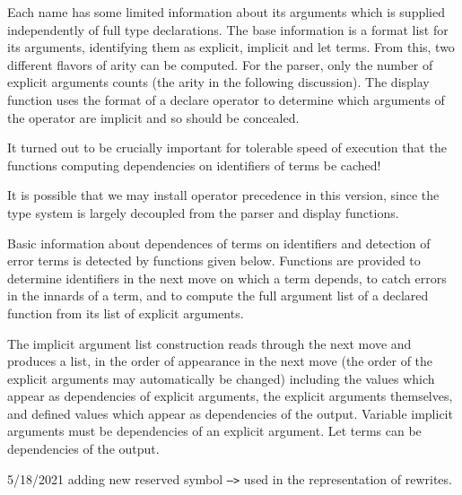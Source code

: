 \documentclass[12pt]{article}
\begin{document}
Each name has some limited information about its arguments which is supplied independently of full type declarations.  The base information is
a format list for its arguments, identifying them as explicit, implicit and let terms.  From this, two different flavors of arity can be computed.  For the parser,
only the number of explicit arguments counts (the arity in the following discussion).    The display function uses the format of a declare operator to determine
which arguments of the operator are implicit and so should be concealed.

It turned out to be crucially important for tolerable speed of execution that the functions computing dependencies on identifiers of terms be cached!

It is possible that we may install operator precedence in this version, since the type system is largely decoupled from the parser and display functions.

Basic information about dependences of terms on identifiers and detection of error terms is detected by functions given below.  Functions are provided to determine identifiers
in the next move on which a term depends, to catch errors in the innards of a term, and to compute the full argument list of a declared function from its list of explicit arguments.

The implicit argument list construction reads through the next move and produces a list, in the order of appearance in the next move (the order of the explicit arguments may automatically be changed) including the values which appear as dependencies of explicit arguments, the explicit arguments themselves, and defined values which appear as dependencies of the output.  Variable implicit arguments must be dependencies of an explicit argument.  Let terms can be dependencies of the output.

5/18/2021 adding new reserved symbol {\tt -->} used in the representation of rewrites.
\end{document}
